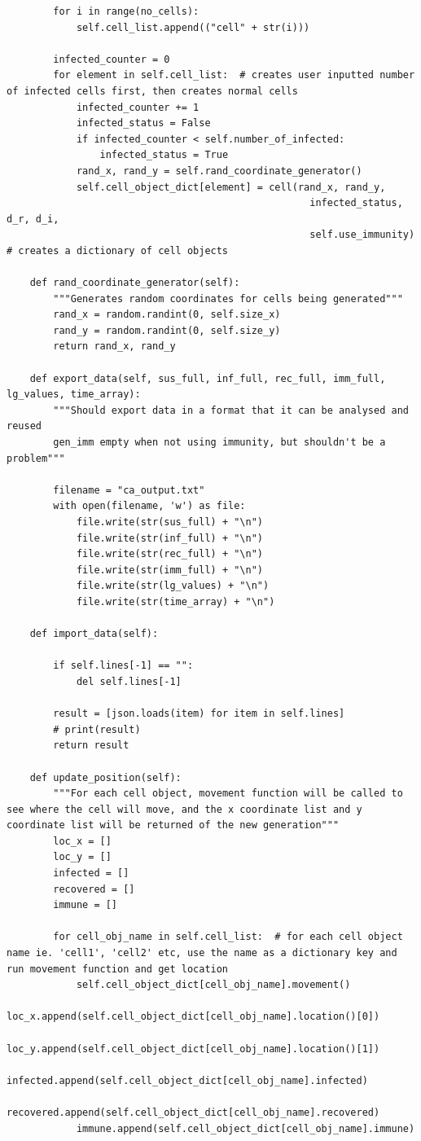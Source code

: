 \documentclass[11pt, a4paper]{article}
\begin{document}
\begin{lstlisting}
        for i in range(no_cells):
            self.cell_list.append(("cell" + str(i)))

        infected_counter = 0
        for element in self.cell_list:  # creates user inputted number of infected cells first, then creates normal cells
            infected_counter += 1
            infected_status = False
            if infected_counter < self.number_of_infected:
                infected_status = True
            rand_x, rand_y = self.rand_coordinate_generator()
            self.cell_object_dict[element] = cell(rand_x, rand_y,
                                                    infected_status, d_r, d_i,
                                                    self.use_immunity)  # creates a dictionary of cell objects

    def rand_coordinate_generator(self):
        """Generates random coordinates for cells being generated"""
        rand_x = random.randint(0, self.size_x)
        rand_y = random.randint(0, self.size_y)
        return rand_x, rand_y

    def export_data(self, sus_full, inf_full, rec_full, imm_full, lg_values, time_array):
        """Should export data in a format that it can be analysed and reused
        gen_imm empty when not using immunity, but shouldn't be a problem"""
    
        filename = "ca_output.txt"
        with open(filename, 'w') as file:
            file.write(str(sus_full) + "\n")
            file.write(str(inf_full) + "\n")
            file.write(str(rec_full) + "\n")
            file.write(str(imm_full) + "\n")
            file.write(str(lg_values) + "\n")
            file.write(str(time_array) + "\n")

    def import_data(self):

        if self.lines[-1] == "":
            del self.lines[-1]

        result = [json.loads(item) for item in self.lines]
        # print(result)
        return result

    def update_position(self):
        """For each cell object, movement function will be called to see where the cell will move, and the x coordinate list and y coordinate list will be returned of the new generation"""
        loc_x = []
        loc_y = []
        infected = []
        recovered = []
        immune = []

        for cell_obj_name in self.cell_list:  # for each cell object name ie. 'cell1', 'cell2' etc, use the name as a dictionary key and run movement function and get location
            self.cell_object_dict[cell_obj_name].movement()
            loc_x.append(self.cell_object_dict[cell_obj_name].location()[0])
            loc_y.append(self.cell_object_dict[cell_obj_name].location()[1])
            infected.append(self.cell_object_dict[cell_obj_name].infected)
            recovered.append(self.cell_object_dict[cell_obj_name].recovered)
            immune.append(self.cell_object_dict[cell_obj_name].immune)


\end{lstlisting}
\end{document}

